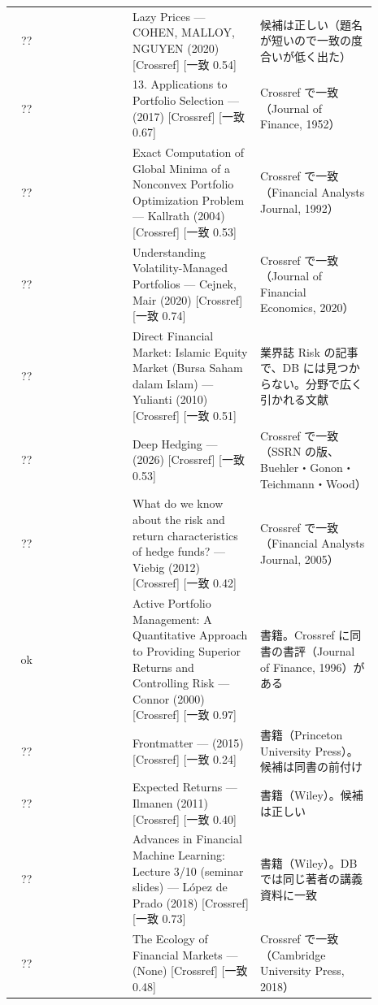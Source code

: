 {\begin{longtable}{@{}cP{0.22\linewidth}P{0.35\linewidth}P{0.32\linewidth}@{}}
?? &  & Lazy Prices — COHEN, MALLOY, NGUYEN (2020) [Crossref]  [一致 0.54] & 候補は正しい（題名が短いので一致の度合いが低く出た） \\
?? &  & 13. Applications to Portfolio Selection —  (2017) [Crossref]  [一致 0.67] & Crossref で一致（Journal of Finance, 1952） \\
?? &  & Exact Computation of Global Minima of a Nonconvex Portfolio Optimization Problem — Kallrath (2004) [Crossref]  [一致 0.53] & Crossref で一致（Financial Analysts Journal, 1992） \\
?? &  & Understanding Volatility-Managed Portfolios — Cejnek, Mair (2020) [Crossref]  [一致 0.74] & Crossref で一致（Journal of Financial Economics, 2020） \\
?? &  & Direct Financial Market: Islamic Equity Market (Bursa Saham dalam Islam) — Yulianti (2010) [Crossref]  [一致 0.51] & 業界誌 Risk の記事で、DB には見つからない。分野で広く引かれる文献 \\
?? &  & Deep Hedging —  (2026) [Crossref]  [一致 0.53] & Crossref で一致（SSRN の版、Buehler・Gonon・Teichmann・Wood） \\
?? &  & What do we know about the risk and return characteristics of hedge funds? — Viebig (2012) [Crossref]  [一致 0.42] & Crossref で一致（Financial Analysts Journal, 2005） \\
ok &  & Active Portfolio Management: A Quantitative Approach to Providing Superior Returns and Controlling Risk — Connor (2000) [Crossref]  [一致 0.97] & 書籍。Crossref に同書の書評（Journal of Finance, 1996）がある \\
?? &  & Frontmatter —  (2015) [Crossref]  [一致 0.24] & 書籍（Princeton University Press）。候補は同書の前付け \\
?? &  & Expected Returns — Ilmanen (2011) [Crossref]  [一致 0.40] & 書籍（Wiley）。候補は正しい \\
?? &  & Advances in Financial Machine Learning: Lecture 3/10 (seminar slides) — López de Prado (2018) [Crossref]  [一致 0.73] & 書籍（Wiley）。DB では同じ著者の講義資料に一致 \\
?? &  & The Ecology of Financial Markets —  (None) [Crossref]  [一致 0.48] & Crossref で一致（Cambridge University Press, 2018） \\
\end{longtable}
}
